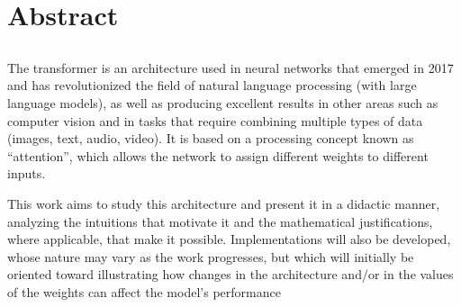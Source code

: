 \chapter*{Abstract}

\section*{\tituloPortadaEngVal}

The transformer is an architecture used in neural networks that emerged in 2017 and has revolutionized the field of natural language processing (with large language models), as well as producing excellent results in other areas such as computer vision and in tasks that require combining multiple types of data (images, text, audio, video). It is based on a processing concept known as ``attention'', which allows the network to assign different weights to different inputs.

This work aims to study this architecture and present it in a didactic manner, analyzing the intuitions that motivate it and the mathematical justifications, where applicable, that make it possible. Implementations will also be developed, whose nature may vary as the work progresses, but which will initially be oriented toward illustrating how changes in the architecture and/or in the values of the weights can affect the model's performance






